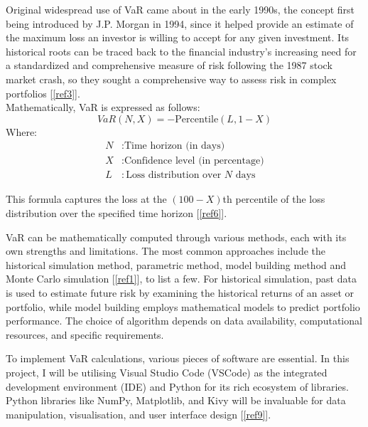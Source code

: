\documentclass{article}
\begin{document}
Original widespread use of VaR came about in the early 1990s, the concept first being introduced by J.P. Morgan in 1994, since it helped provide an estimate of the maximum loss an investor is willing to accept for any given investment. Its historical roots can be traced back to the financial industry's increasing need for a standardized and comprehensive measure of risk following the 1987 stock market crash, so they sought a comprehensive way to assess risk in complex portfolios [\ref{ref3}]. \\

Mathematically, VaR is expressed as follows:
\begin{equation}
VaR(N, X) = -\text{Percentile}(L, 1 - X)
\end{equation}
Where:
\begin{align*}
N & : \text{Time horizon (in days)} \\
X & : \text{Confidence level (in percentage)} \\
L & : \text{Loss distribution over } N \text{ days}
\end{align*}

This formula captures the loss at the \((100-X)\)th percentile of the loss distribution over the specified time horizon [\ref{ref6}]. \\\vspace{0.3cm}

VaR can be mathematically computed through various methods, each with its own strengths and limitations. The most common approaches include the historical simulation method, parametric method, model building method and Monte Carlo simulation [\ref{ref1}], to list a few. For historical simulation, past data is used to estimate future risk by examining the historical returns of an asset or portfolio, while model building employs mathematical models to predict portfolio performance. The choice of algorithm depends on data availability, computational resources, and specific requirements.\\\vspace{0.3cm}

To implement VaR calculations, various pieces of software are essential. In this project, I will be utilising Visual Studio Code (VSCode) as the integrated development environment (IDE) and Python for its rich ecosystem of libraries. Python libraries like NumPy, Matplotlib, and Kivy will be invaluable for data manipulation, visualisation, and user interface design [\ref{ref9}].\\\vspace{0.3cm}
\end{document}
